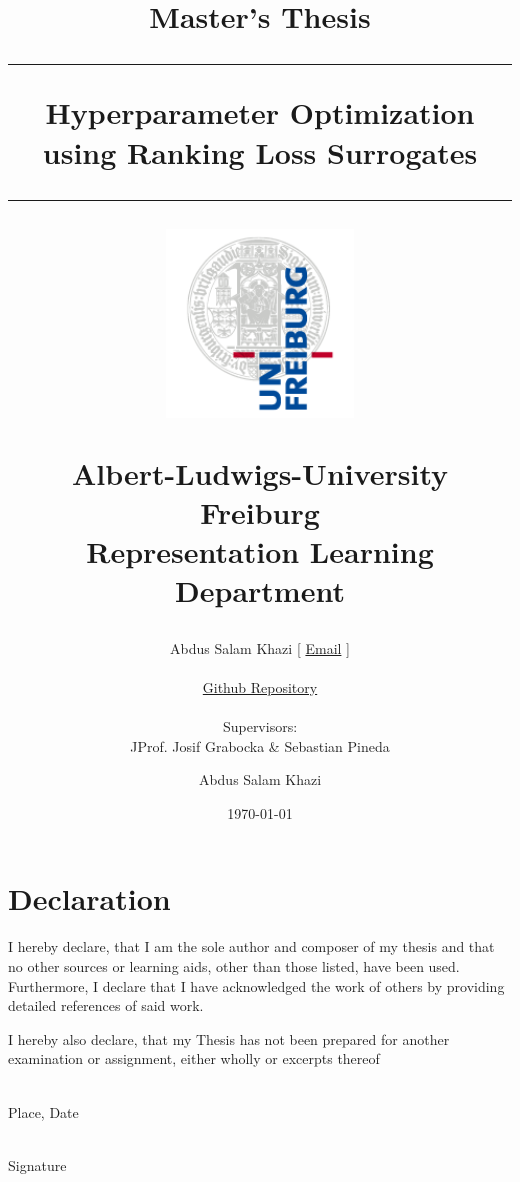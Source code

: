 \documentclass[12pt, twoside, ngerman]{report}
\author{
        Abdus Salam Khazi [
        \href{mailto:abdus.khazi@students.uni-freiburg.de}
                {Email} ]\\ \\
        \href{https://github.com/abduskhazi/ranking-loss-surrogates.git}
                {Github Repository} \cite{github_repository} \\ \\
        Supervisors:
        \begin{tabular}{ll}
             JProf. Josif Grabocka \&
			Sebastian Pineda
		\end{tabular}
       }
\begin{document}

\title{
{\LARGE Master's Thesis}
\vspace{20pt}
\hrule
\vspace{20pt}
\textbf{Hyperparameter Optimization using Ranking Loss Surrogates}
\vspace{20pt}
\hrule
\vspace{20pt}
\author{{\LARGE Abdus Salam Khazi}}
\date{\LARGE \today}
\begin{figure}[h]
    \centering
    \includegraphics[width=50mm]{images/Logo.png}
\end{figure}
\large{Albert-Ludwigs-University Freiburg
\\Representation Learning Department}
}
    

\maketitle
    


\chapter*{Declaration \thispagestyle{empty}}


I hereby declare, that I am the sole author and composer of my thesis and that no other sources or learning aids, other than those listed, have been used. Furthermore, I declare that I have acknowledged the work of others by providing detailed references of said work. 

I hereby also declare, that my Thesis has not been prepared for another examination or assignment, either wholly or excerpts thereof

\vspace{100pt}

\begin{minipage}{2in}
\textbf{\underline{\hspace{100pt}}} \\
Place, Date
\end{minipage}
\hfill
\begin{minipage}{1.3in}
\textbf{\underline{\hspace{100pt}}} \\
Signature
\end{minipage}
\end{document}

